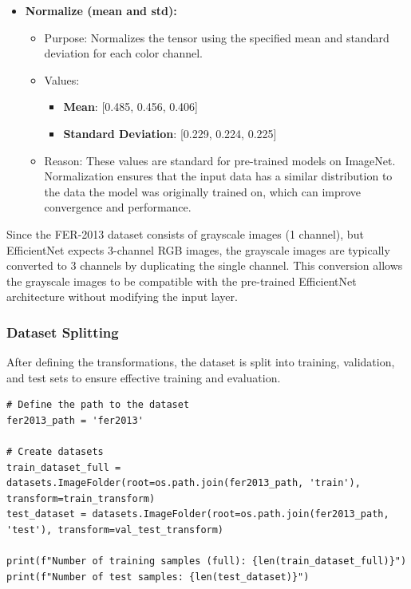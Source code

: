 \documentclass{article}
\begin{document}
\begin{itemize}
    \item \textbf{Normalize (mean and std):}
    \begin{itemize}
        \item Purpose: Normalizes the tensor using the specified mean and standard deviation for each color channel.
        \item Values:
        \begin{itemize}
            \item \textbf{Mean}: [0.485, 0.456, 0.406]
            \item \textbf{Standard Deviation}: [0.229, 0.224, 0.225]
        \end{itemize}
        \item Reason: These values are standard for pre-trained models on ImageNet. Normalization ensures that the input data has a similar distribution to the data the model was originally trained on, which can improve convergence and performance.
    \end{itemize}
\end{itemize}

Since the FER-2013 dataset consists of grayscale images (1 channel), but EfficientNet expects 3-channel RGB images, the grayscale images are typically converted to 3 channels by duplicating the single channel. This conversion allows the grayscale images to be compatible with the pre-trained EfficientNet architecture without modifying the input layer.

\subsubsection*{Dataset Splitting}

After defining the transformations, the dataset is split into training, validation, and test sets to ensure effective training and evaluation.

\begin{verbatim}
# Define the path to the dataset
fer2013_path = 'fer2013'

# Create datasets
train_dataset_full = datasets.ImageFolder(root=os.path.join(fer2013_path, 'train'), transform=train_transform)
test_dataset = datasets.ImageFolder(root=os.path.join(fer2013_path, 'test'), transform=val_test_transform)

print(f"Number of training samples (full): {len(train_dataset_full)}")
print(f"Number of test samples: {len(test_dataset)}")
\end{verbatim}
\end{document}
